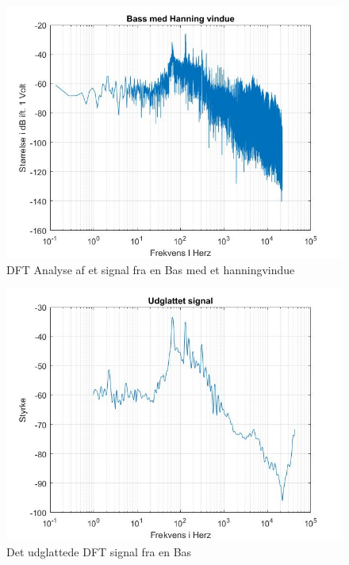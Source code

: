 \begin{figure}[ht!]
	\centering
	\includegraphics[width=180mm]{figures/Bass/hanning.jpg}
	\caption{DFT Analyse af et signal fra en Bas med et hanningvindue}
	\label{fig:Bas hanning}
\end{figure}

\begin{figure}[ht!]
	\centering
	\includegraphics[width=180mm]{figures/Bass/udglattet.jpg}
	\caption{Det udglattede DFT signal fra en Bas}
	\label{fig:Bas udglattet}
\end{figure}



